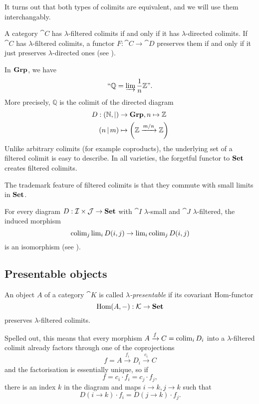 It turns out that both types of colimits are equivalent, and we will use them interchangably.

\begin{Proposition}A category $\cat C$ has $\lambda$-filtered colimits if and only if it has $\lambda$-directed colimits. If $\cat C$ has $\lambda$-filtered colimits, a functor $F : \cat C \to \cat D$ preserves them if and only if it just preserves $\lambda$-directed ones (see \cite[Remark 1.21]{AdamekRosicky}).
\end{Proposition}

\begin{Example}\label{ex:Q}
In $\mathbf{Grp}$, we have 
\[ \text{``}\mathbb Q = \varinjlim \frac 1 n \mathbb Z\text{''}. \]
More precisely, $\mathbb Q$ is the colimit of the directed diagram
\begin{align*}
 D : (\mathbb N, |) &\to \mathbf{Grp}, n \mapsto \mathbb Z \\
 (n\, | \,m) &\mapsto \left(\mathbb Z \xrightarrow{m/n} \mathbb Z\right)
\end{align*}
Unlike arbitrary colimits (for example coproducts), the underlying set of a filtered colimit is easy to describe. In all varieties, the forgetful functor to $\mathbf{Set}$ creates filtered colimits.
\end{Example}

The trademark feature of filtered colimits is that they commute with small limits in $\mathbf{Set}$.

\begin{Lemma}\label{prop:smallvsfiltered}
For every diagram $D : \mathcal{I} \times \mathcal{J} \to \mathbf{Set}$ with $\cat I$ $\lambda$-small and $\cat J$ $\lambda$-filtered, the induced morphism
\[ \operatorname{colim}_j \operatorname{lim}_i D(i,j) \to \operatorname{lim}_i \operatorname{colim}_j D(i,j) \]
is an isomorphism (see \cite[Theorem 1.2.1]{MakkaiPare}).
\end{Lemma}

\subsection{Presentable objects}
\begin{Definition}\label{def:presentableobject}
An object $A$ of a category $\cat K$ is called \emph{$\lambda$-presentable} if its covariant Hom-functor 
\[ \textrm{Hom}(A,-) : \mathcal{K} \to \mathbf{Set} \]
preserves $\lambda$-filtered colimits.
\end{Definition}
Spelled out, this means that every morphism $A \xrightarrow{f} C = \operatorname{colim}_i D_i$ into a $\lambda$-filtered colimit already factors through one of the coprojections
\[ f = A \xrightarrow{f_i} D_i \xrightarrow{c_i} C \]
and the factorisation is essentially unique, so if \[ f = c_i\cdot f_i = c_j \cdot f_j, \]
there is an index $k$ in the diagram and maps $i \to k, j \to k$ such that
\[ D(i \to k)\cdot f_i = D(j \to k) \cdot f_j. \]

